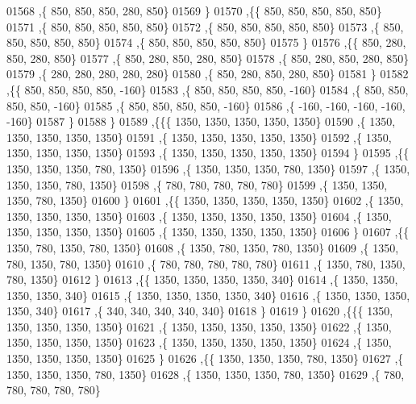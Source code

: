 \begin{DoxyCode}
01568    ,\{   850,   850,   850,   280,   850\}
01569    \}
01570   ,\{\{   850,   850,   850,   850,   850\}
01571    ,\{   850,   850,   850,   850,   850\}
01572    ,\{   850,   850,   850,   850,   850\}
01573    ,\{   850,   850,   850,   850,   850\}
01574    ,\{   850,   850,   850,   850,   850\}
01575    \}
01576   ,\{\{   850,   280,   850,   280,   850\}
01577    ,\{   850,   280,   850,   280,   850\}
01578    ,\{   850,   280,   850,   280,   850\}
01579    ,\{   280,   280,   280,   280,   280\}
01580    ,\{   850,   280,   850,   280,   850\}
01581    \}
01582   ,\{\{   850,   850,   850,   850,  -160\}
01583    ,\{   850,   850,   850,   850,  -160\}
01584    ,\{   850,   850,   850,   850,  -160\}
01585    ,\{   850,   850,   850,   850,  -160\}
01586    ,\{  -160,  -160,  -160,  -160,  -160\}
01587    \}
01588   \}
01589  ,\{\{\{  1350,  1350,  1350,  1350,  1350\}
01590    ,\{  1350,  1350,  1350,  1350,  1350\}
01591    ,\{  1350,  1350,  1350,  1350,  1350\}
01592    ,\{  1350,  1350,  1350,  1350,  1350\}
01593    ,\{  1350,  1350,  1350,  1350,  1350\}
01594    \}
01595   ,\{\{  1350,  1350,  1350,   780,  1350\}
01596    ,\{  1350,  1350,  1350,   780,  1350\}
01597    ,\{  1350,  1350,  1350,   780,  1350\}
01598    ,\{   780,   780,   780,   780,   780\}
01599    ,\{  1350,  1350,  1350,   780,  1350\}
01600    \}
01601   ,\{\{  1350,  1350,  1350,  1350,  1350\}
01602    ,\{  1350,  1350,  1350,  1350,  1350\}
01603    ,\{  1350,  1350,  1350,  1350,  1350\}
01604    ,\{  1350,  1350,  1350,  1350,  1350\}
01605    ,\{  1350,  1350,  1350,  1350,  1350\}
01606    \}
01607   ,\{\{  1350,   780,  1350,   780,  1350\}
01608    ,\{  1350,   780,  1350,   780,  1350\}
01609    ,\{  1350,   780,  1350,   780,  1350\}
01610    ,\{   780,   780,   780,   780,   780\}
01611    ,\{  1350,   780,  1350,   780,  1350\}
01612    \}
01613   ,\{\{  1350,  1350,  1350,  1350,   340\}
01614    ,\{  1350,  1350,  1350,  1350,   340\}
01615    ,\{  1350,  1350,  1350,  1350,   340\}
01616    ,\{  1350,  1350,  1350,  1350,   340\}
01617    ,\{   340,   340,   340,   340,   340\}
01618    \}
01619   \}
01620  ,\{\{\{  1350,  1350,  1350,  1350,  1350\}
01621    ,\{  1350,  1350,  1350,  1350,  1350\}
01622    ,\{  1350,  1350,  1350,  1350,  1350\}
01623    ,\{  1350,  1350,  1350,  1350,  1350\}
01624    ,\{  1350,  1350,  1350,  1350,  1350\}
01625    \}
01626   ,\{\{  1350,  1350,  1350,   780,  1350\}
01627    ,\{  1350,  1350,  1350,   780,  1350\}
01628    ,\{  1350,  1350,  1350,   780,  1350\}
01629    ,\{   780,   780,   780,   780,   780\}

\end{DoxyCode}
